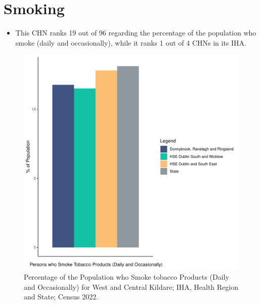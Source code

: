 \documentclass{article}
\begin{document}
\pagebreak

\section{Smoking}\label{sect:Smoking}
\begin{itemize}
\item This CHN ranks  19 out of 96 regarding the percentage of the population who smoke (daily and occasionally), while it ranks   1 out of 4 CHNs in its IHA.
\end{itemize}
\begin{figure}[H]
	\centering
	\includegraphics[width = 120mm]{../figures/SmokingED.pdf}
	\caption{Percentage of the Population who Smoke tobacco Products (Daily and Occasionally) for West and Central Kildare; IHA, Health Region and State; Census 2022.}
	\label{fig:2ae19629-1a6a-13a3-e055-000000000001}
	\end{figure}
	
\end{document}
